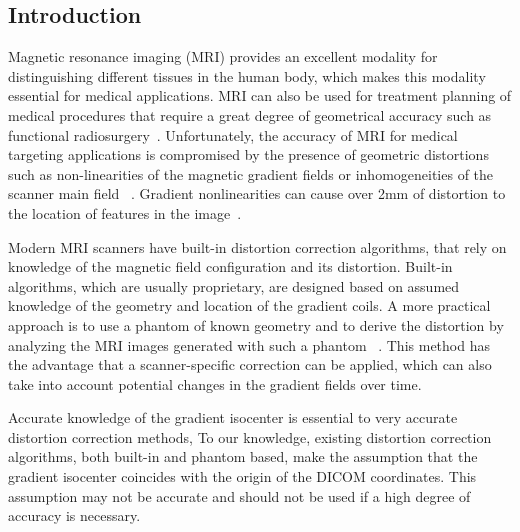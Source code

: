 \subsection{Introduction}
\label{Introduction}

Magnetic resonance imaging (MRI) provides an excellent modality for distinguishing different tissues in the human body, which makes this modality essential for medical applications. MRI can also be used for treatment planning of medical procedures that require a great degree of geometrical accuracy such as  functional radiosurgery~\cite{Kond99}. Unfortunately, the accuracy of MRI for medical targeting applications is compromised by the presence of geometric distortions such as non-linearities of the magnetic gradient fields or inhomogeneities of the scanner main field ~\cite{Dor05,LSS06a,LSS06b,LSS08a,LSS08b,Lang99,Wang04a,Wang04b}. Gradient nonlinearities can cause over 2mm of distortion to the location of features in the image~\cite{LSS08b,Lang99}.

Modern MRI scanners have built-in distortion correction algorithms, that rely on knowledge of the magnetic field configuration and its distortion. Built-in algorithms, which are usually proprietary, are designed based on assumed knowledge of the geometry and location of the gradient coils. A more practical approach is to use a phantom of known geometry and to derive the distortion by analyzing the MRI images generated with such a phantom ~\cite{Dor05,LSS06a,LSS06b,LSS08a,LSS08b,Lang99,Wang04a,Wang04b}. This method has the advantage that a scanner-specific correction can be applied, which can also take into account potential changes in the gradient fields over time.

Accurate knowledge of the gradient isocenter is essential to very accurate distortion correction methods, To our knowledge, existing distortion correction algorithms, both built-in and phantom based, make the assumption that the gradient isocenter coincides with the origin of the DICOM coordinates. This assumption may not be accurate and should not be used if a high degree of accuracy is necessary.

